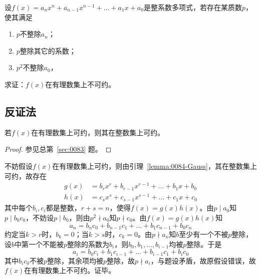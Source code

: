 

设$f(x) = a_nx^n + a_{n - 1}x^{n - 1} + \dots + a_1x + a_0$是整系数多项式，若存在某质数$p$，使其满足
\begin{enumerate}
  \item $p$不整除$a_n$；
  \item $p$整除其它的系数；
  \item $p^2$不整除$a_0$，
\end{enumerate}
求证：$f(x)$在有理数集上不可约。

\subsection{反证法}

\begin{lemma}[Gauss引理] \label{lemma:0084-Gauss}
  若$f(x)$在有理数集上可约，则其在整数集上可约。
\end{lemma}

\begin{proof}
  参见总第~\ref{sec:0083} 题。
\end{proof}

不妨假设$f(x)$在有理数集上可约，则由引理~\ref{lemma:0084-Gauss}，其在整数集上可约，故存在
\begin{align*}
  g(x) &= b_rx^r + b_{r - 1}x^{r - 1} + \dots + b_1x + b_0 \\
  h(x) &= c_sx^s + c_{s - 1}x^{s - 1} + \dots + c_1x + c_0
\end{align*}
其中每个$b_i, c_i$都是整数，$r + s = n$，使得$f(x) = g(x)h(x)$。由$p \mid a_0$知$p \mid b_0c_0$，不妨设$p \mid b_0$，则由$p^2 \nmid a_0$知$p \nmid c_0$。由$f(x) = g(x)h(x)$知
\[ a_n = b_nc_0 + b_{n - 1}c_1 + \dots + b_1c_{n - 1} + b_0c_n \]
约定当$k > r$时，$b_k = 0$；当$k > s$时，$c_k = 0$。由$p \nmid a_n$知$b$至少有一个不被$p$整除，设$b$中第一个不能被$p$整除的系数为$b_i$，则$b_0, b_1, \dots, b_{i - 1}$均被$p$整除。于是
\[ a_i = b_0c_i + b_1c_{i - 1} + \dots + b_{i - 1}c_1 + b_ic_0 \]
其中$b_ic_0$不被$p$整除，其余项均被$p$整除，故$p \nmid a_i$，与题设矛盾，故原假设错误，故$f(x)$在有理数集上不可约。证毕。
